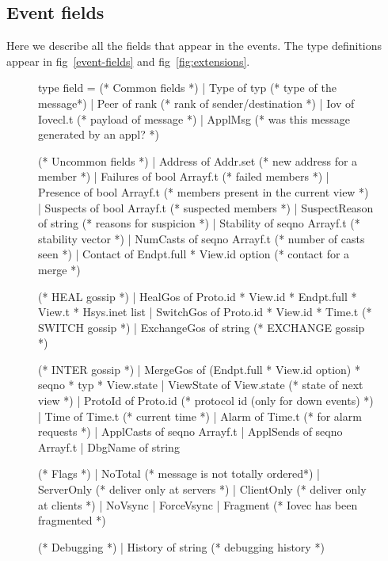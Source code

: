 \subsection{Event fields}
Here we describe all the fields that appear in the events. The
type definitions appear in fig~\ref{event-fields} and
fig~\ref{fig:extensions}.  

\begin{figure}
\begin{codebox}
type field =
      (* Common fields *)
  | Type        of typ            (* type of the message*)
  | Peer        of rank           (* rank of sender/destination *)
  | Iov	        of Iovecl.t       (* payload of message *)
  | ApplMsg                       (* was this message generated by an appl? *)

      (* Uncommon fields *)
  | Address     of Addr.set	  (* new address for a member *)
  | Failures    of bool Arrayf.t  (* failed members *)
  | Presence    of bool Arrayf.t  (* members present in the current view *)
  | Suspects    of bool Arrayf.t  (* suspected members *)
  | SuspectReason of string	  (* reasons for suspicion *)
  | Stability   of seqno Arrayf.t (* stability vector *)
  | NumCasts    of seqno Arrayf.t (* number of casts seen *)
  | Contact     of Endpt.full * View.id option (* contact for a merge *)

      (* HEAL gossip *)  
  | HealGos     of Proto.id * View.id * Endpt.full * View.t * Hsys.inet list
  | SwitchGos   of Proto.id * View.id * Time.t  (* SWITCH gossip *)
  | ExchangeGos	of string		(* EXCHANGE gossip *)

      (* INTER gossip *)
  | MergeGos    of (Endpt.full * View.id option) * seqno * typ * View.state
  | ViewState   of View.state	(* state of next view *)
  | ProtoId     of Proto.id	(* protocol id (only for down events) *)
  | Time        of Time.t	(* current time *)
  | Alarm       of Time.t	(* for alarm requests *)
  | ApplCasts   of seqno Arrayf.t
  | ApplSends   of seqno Arrayf.t
  | DbgName     of string

      (* Flags *)
  | NoTotal                     (* message is not totally ordered*)
  | ServerOnly	                (* deliver only at servers *)
  | ClientOnly	                (* deliver only at clients *)
  | NoVsync
  | ForceVsync
  | Fragment	                (* Iovec has been fragmented *)

      (* Debugging *)
  | History     of string       (* debugging history *)


\end{codebox}
\end{figure}
